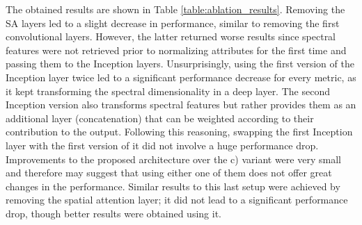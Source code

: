 The obtained results are shown in Table \ref{table:ablation_results}. Removing the SA layers led to a slight decrease in performance, similar to removing the first convolutional layers. However, the latter returned worse results since spectral features were not retrieved prior to normalizing attributes for the first time and passing them to the Inception layers. Unsurprisingly, using the first version of the Inception layer twice led to a significant performance decrease for every metric, as it kept transforming the spectral dimensionality in a deep layer. The second Inception version also transforms spectral features but rather provides them as an additional layer (concatenation) that can be weighted according to their contribution to the output. Following this reasoning, swapping the first Inception layer with the first version of it did not involve a huge performance drop. Improvements to the proposed architecture over the c) variant were very small and therefore may suggest that using either one of them does not offer great changes in the performance. Similar results to this last setup were achieved by removing the spatial attention layer; it did not lead to a significant performance drop, though better results were obtained using it. 

\newcommand{\specialcell}[2][c]{\begin{tabular}[#1]{@{}c@{}}#2\end{tabular}}
\newcommand{\numberVariance}[2]{#1 $\pm$ #2}


